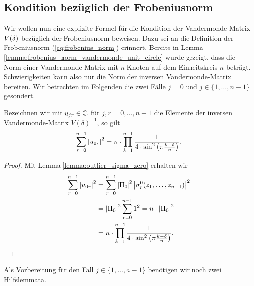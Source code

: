 \subsection{Kondition bezüglich der Frobeniusnorm}
Wir wollen nun eine explizite Formel für die Kondition der Vandermonde-Matrix
$V \! \left( \delta \right)$ bezüglich der Frobeniusnorm beweisen.
Dazu sei an die Definition der Frobeniusnorm (\ref{eq:frobenius_norm}) erinnert.
Bereits in Lemma \ref{lemma:frobenius_norm_vandermonde_unit_circle} wurde
gezeigt, dass die Norm einer Vandermonde-Matrix mit $n$ Knoten auf dem
Einheitskreis $n$ beträgt.
Schwierigkeiten kann also nur die Norm der inversen Vandermonde-Matrix
bereiten.  Wir betrachten im Folgenden die zwei Fälle $j=0$ und
$j \in \{1, \dots, n-1\}$ gesondert.

\begin{lemma}
    \label{lemma:inverse_outlier_zero_row_quadratic_sum}
    Bezeichnen wir mit $u_{jr} \in \mathbb{C}$ für $j, r = 0, \dots, n-1$ die Elemente
    der inversen Vandermonde-Matrix $V(\delta)^{-1}$, so gilt
    \[
        \sum_{r=0}^{n-1} \left\lvert u_{0r} \right\rvert^2
        = n \cdot \prod_{k=1}^{n-1} \frac{1}{4 \cdot \sin^2 \left( \pi \frac{k-\delta}{n} \right)}.
    \]
\end{lemma}
\begin{proof}
    Mit Lemma \ref{lemma:outlier_sigma_zero} erhalten wir
    \[
        \begin{split}
            \sum_{r=0}^{n-1} \left\lvert u_{0r} \right\rvert^2
            &= \sum_{r=0}^{n-1} \left\lvert \Pi_0 \right\rvert^2 \left\lvert \sigma_{r}^{0}(z_1, \dots, z_{n-1}) \right\rvert^2\\
            &= \left\lvert \Pi_0 \right\rvert^2 \sum_{r=0}^{n-1} 1^2
            = n \cdot \left\lvert \Pi_0 \right\rvert^2\\
            &= n \cdot \prod_{k=1}^{n-1} \frac{1}{4 \cdot \sin^2 \left( \pi \frac{k-\delta}{n} \right)}.
        \end{split}
    \]
\end{proof}

Als Vorbereitung für den Fall $j \in \{1, \dots, n-1\}$ benötigen wir noch zwei
Hilfslemmata.

